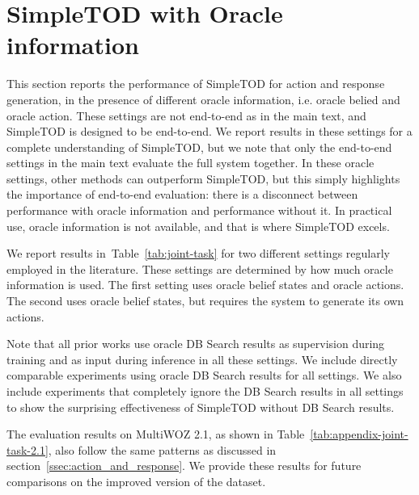 \documentclass{article}
\begin{document}
\section{SimpleTOD with Oracle information}
\label{appendix:multiwoz_2.1}
This section reports the performance of SimpleTOD for action and response generation, in the presence of different oracle information, i.e. oracle belied and oracle action.
These settings are not end-to-end as in the main text, and SimpleTOD is designed to be end-to-end.
We report results in these settings for a complete understanding of SimpleTOD,
but we note that only the end-to-end settings in the main text evaluate the full system together. 
In these oracle settings, 
other methods can outperform SimpleTOD, 
but this simply highlights the importance of end-to-end evaluation: there is a disconnect between performance with oracle information and performance without it. 
In practical use, oracle information is not available, and that is where SimpleTOD excels.


We report results in~Table~\ref{tab:joint-task} for two different settings regularly employed in the literature.
These settings are determined by how much oracle information is used.
The first setting uses oracle belief states and oracle actions.
The second uses oracle belief states, but requires the system to generate its own actions.


Note that all prior works use oracle DB Search results as supervision during training and as input during inference in all these settings.
We include directly comparable experiments using oracle DB Search results for all settings.
We also include experiments that completely ignore the DB Search results in all settings to show the surprising effectiveness of SimpleTOD without DB Search results.






 The evaluation results on MultiWOZ 2.1, as shown in Table~\ref{tab:appendix-joint-task-2.1}, also follow the same patterns as discussed in section~\ref{ssec:action_and_response}.
 We provide these results for future comparisons on the improved version of the dataset.
\end{document}

